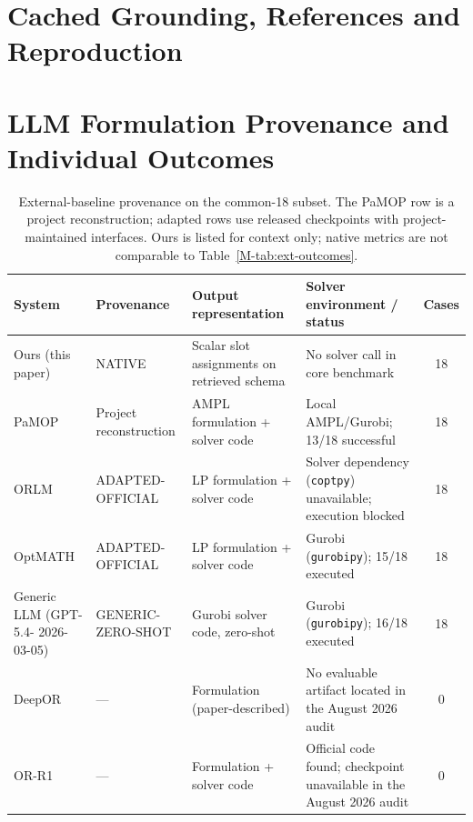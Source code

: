 \documentclass[pdflatex,sn-basic,Numbered]{sn-jnl}
\renewcommand{\arraystretch}{1.18}
\begin{document}
\section{Cached Grounding, References and Reproduction}
\label{app:grounding-diagnostics}




\section{LLM Formulation Provenance and Individual Outcomes}
\label{app:common18}
\begin{table}[htbp]
  \centering
  \caption{External-baseline provenance on the common-18 subset. The PaMOP row is a project reconstruction; adapted rows use released checkpoints with project-maintained interfaces. Ours is listed for context only; native metrics are not comparable to Table~\ref{M-tab:ext-outcomes}.}
  \label{tab:ext-context}
  \small
  \setlength{\tabcolsep}{3pt}
  \renewcommand{\arraystretch}{1.15}
  \begin{tabular}{@{}>{\raggedright\arraybackslash}p{1.9cm}>{\raggedright\arraybackslash}p{2.6cm}>{\raggedright\arraybackslash}p{2.5cm}>{\raggedright\arraybackslash}p{3.55cm}c@{}}
    \toprule
    System & Provenance & Output representation & Solver environment / status & Cases \\
    \midrule
    Ours (this paper) & NATIVE & Scalar slot assignments on retrieved schema & No solver call in core benchmark & 18 \\
    PaMOP \cite{pan2025pamop} & Project reconstruction & AMPL formulation + solver code & Local AMPL/Gurobi; 13/18 successful & 18 \\
    ORLM \cite{huang2025orlm} & ADAPTED- OFFICIAL & LP formulation + solver code & Solver dependency (\texttt{coptpy}) unavailable; execution blocked & 18 \\
    OptMATH \cite{lu2025optmath} & ADAPTED- OFFICIAL & LP formulation + solver code & Gurobi (\texttt{gurobipy}); 15/18 executed & 18 \\
    Generic LLM (GPT-5.4- 2026-03-05) & GENERIC- ZERO-SHOT & Gurobi solver code, zero-shot & Gurobi (\texttt{gurobipy}); 16/18 executed & 18 \\
    DeepOR \cite{xiao2026deepor} & --- & Formulation (paper-described) & No evaluable artifact located in the August 2026 audit & 0 \\
    OR-R1 \cite{ding2026orr1} & --- & Formulation + solver code & Official code found; checkpoint unavailable in the August 2026 audit & 0 \\
    \bottomrule
  \end{tabular}
\end{table}

\end{document}

